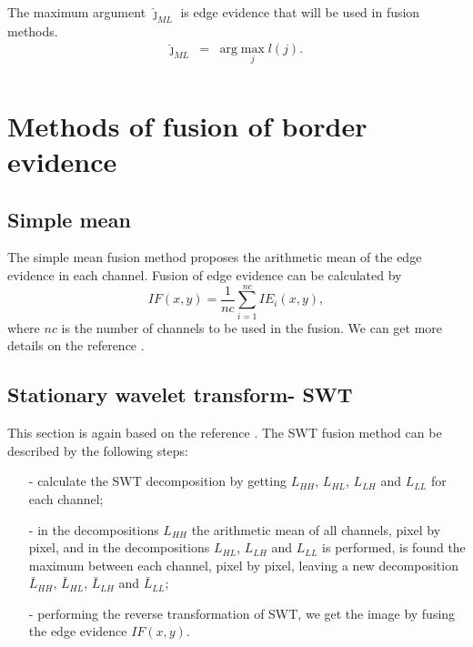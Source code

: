 \documentclass[conference]{IEEEtran}
\begin{document}
{{{{The maximum argument $\widehat{\jmath}_{ML}$ is edge evidence that will be used in fusion methods.
\begin{equation*}
\begin{array}{rcl}
	\widehat{\jmath}_{ML}&=&\text{arg}\max\limits_{j}l(j).  \\
\end{array}
\end{equation*}
\section{Methods of fusion of border evidence}\label{sec_06}
\subsection{Simple mean}
The simple mean fusion method proposes the arithmetic mean of the edge evidence in each channel. Fusion of edge evidence can be calculated by
\begin{equation}
	IF(x,y)=\frac{1}{nc}\sum_{i=1}^{nc}IE_i(x,y),
\end{equation}
where $nc$ is the number of channels to be used in the fusion. We can get more details on the reference \cite{mit}.
\subsection{Stationary wavelet transform- SWT} 
This section is again based on the reference \cite{n_r}. The SWT fusion method can be described by the following steps:
\begin{itemize}
\item[-] calculate the SWT decomposition by getting $L_{HH}$, $L_{HL}$, $L_{LH}$ and $L_{LL}$ for each channel;
\item[-] in the decompositions $L_{HH}$ the arithmetic mean of all channels, pixel by pixel, and in the decompositions $L_{HL}$, $L_{LH}$ and $L_{LL}$ is performed, is found the maximum between each channel, pixel by pixel, leaving a new decomposition $\bar{L}_{HH}$, $\bar{L}_{HL}$, $\bar{L}_{LH}$ and $\bar{L}_{LL}$;
\item[-] performing the reverse transformation of SWT, we get the image by fusing the edge evidence $IF(x,y)$.  
\end{itemize}

}}}}
\end{document}
